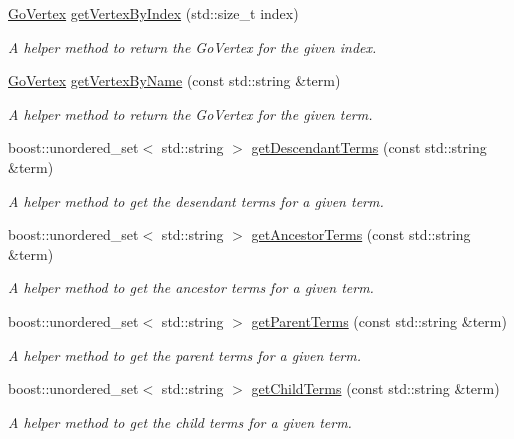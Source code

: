 \begin{DoxyCompactItemize}
\hyperlink{classGoGraph_afabec0fb17c98de989e7dd9f3a54e650}{Go\+Vertex} \hyperlink{classGoGraph_a69f38e249704b7e8d9f31a2e3bc03633}{get\+Vertex\+By\+Index} (std\+::size\+\_\+t index)
\begin{DoxyCompactList}\small\item\em A helper method to return the Go\+Vertex for the given index. \end{DoxyCompactList}\item 
\hyperlink{classGoGraph_afabec0fb17c98de989e7dd9f3a54e650}{Go\+Vertex} \hyperlink{classGoGraph_aa66361d5993e6fdf5bd320b6ae15e4bc}{get\+Vertex\+By\+Name} (const std\+::string \&term)
\begin{DoxyCompactList}\small\item\em A helper method to return the Go\+Vertex for the given term. \end{DoxyCompactList}\item 
boost\+::unordered\+\_\+set$<$ std\+::string $>$ \hyperlink{classGoGraph_a0d0a197cc51be0c2f9d0f524a8d66b5e}{get\+Descendant\+Terms} (const std\+::string \&term)
\begin{DoxyCompactList}\small\item\em A helper method to get the desendant terms for a given term. \end{DoxyCompactList}\item 
boost\+::unordered\+\_\+set$<$ std\+::string $>$ \hyperlink{classGoGraph_ae31e1546b740439d44860fa9543c83c2}{get\+Ancestor\+Terms} (const std\+::string \&term)
\begin{DoxyCompactList}\small\item\em A helper method to get the ancestor terms for a given term. \end{DoxyCompactList}\item 
boost\+::unordered\+\_\+set$<$ std\+::string $>$ \hyperlink{classGoGraph_a9907ae6a2960e527f02e7cdf9507aeb1}{get\+Parent\+Terms} (const std\+::string \&term)
\begin{DoxyCompactList}\small\item\em A helper method to get the parent terms for a given term. \end{DoxyCompactList}\item 
boost\+::unordered\+\_\+set$<$ std\+::string $>$ \hyperlink{classGoGraph_ace2ad63bbc6bb2d1dd3e182e6e9c793e}{get\+Child\+Terms} (const std\+::string \&term)
\begin{DoxyCompactList}\small\item\em A helper method to get the child terms for a given term. \end{DoxyCompactList}\item 

\end{DoxyCompactItemize}
